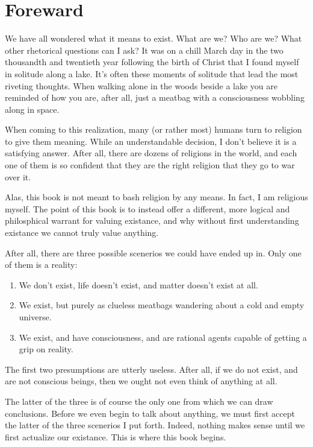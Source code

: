 \chapter{Foreward}

We have all wondered what it means to exist. What are we? Who are we? What other rhetorical questions
can I ask? It was on a chill March day in the two thousandth and twentieth year following the birth of Christ
that I found myself in solitude along a lake. It's often these moments of solitude that lead the most riveting
thoughts. When walking alone in the woods beside a lake you are reminded of how you are, after all, just a 
meatbag with a consciousness wobbling along in space.

When coming to this realization, many (or rather most) humans turn to religion to give them meaning. While
an understandable decision, I don't believe it is a satisfying answer. After all, there are dozens of religions
in the world, and each one of them is so confident that they are the right religion that they go to war over
it.

Alas, this book is not meant to bash religion by any means. In fact, I am religious myself. The point of
this book is to instead offer a different, more logical and philosphical warrant for valuing existance, and
why without first understanding existance we cannot truly value anything.

\pagebreak

After all, there are three possible scenerios we could have ended up in. Only one of them is a reality:

\begin{enumerate}
    \item We don't exist, life doesn't exist, and matter doesn't exist at all.
    \item We exist, but purely as clueless meatbags wandering about a cold and empty universe.
    \item We exist, and have consciousness, and are rational agents capable of getting a grip on reality.
\end{enumerate}

The first two presumptions are utterly useless. After all, if we do not exist, and are not conscious beings,
then we ought not even think of anything at all.

The latter of the three is of course the only one from which we can draw conclusions. Before we even begin
to talk about anything, we must first accept the latter of the three scenerios I put forth. Indeed, nothing
makes sense until we first actualize our existance. This is where this book begins.